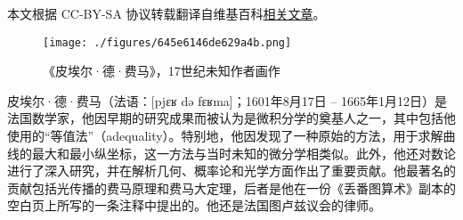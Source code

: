 
本文根据 CC-BY-SA 协议转载翻译自维基百科\href{https://en.wikipedia.org/wiki/Pierre_de_Fermat}{相关文章}。

\begin{figure}[ht]
\centering
\texttt{[image: ./figures/645e6146de629a4b.png]}
\caption{《皮埃尔·德·费马》，17世纪未知作者画作} \label{fig_Pierre_1}
\end{figure}
皮埃尔·德·费马（法语：[pjɛʁ də fɛʁma]；1601年8月17日 – 1665年1月12日）是法国数学家，他因早期的研究成果而被认为是微积分学的奠基人之一，其中包括他使用的“等值法”（adequality）。特别地，他因发现了一种原始的方法，用于求解曲线的最大和最小纵坐标，这一方法与当时未知的微分学相类似。此外，他还对数论进行了深入研究，并在解析几何、概率论和光学方面作出了重要贡献。他最著名的贡献包括光传播的费马原理和费马大定理，后者是他在一份《丢番图算术》副本的空白页上所写的一条注释中提出的。他还是法国图卢兹议会的律师。